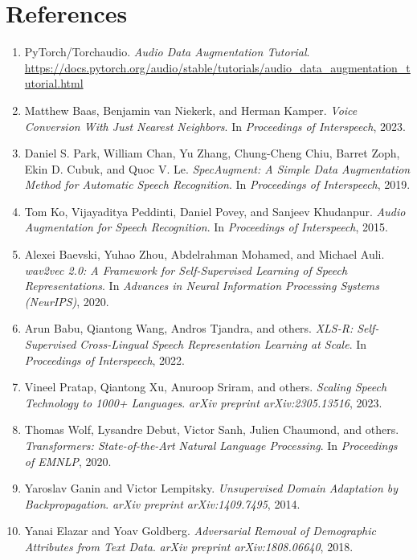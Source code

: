 \documentclass[11pt]{article}
\begin{document}
\section*{References}
\begin{enumerate}

\item PyTorch/Torchaudio. \emph{Audio Data Augmentation Tutorial}.  
\url{https://docs.pytorch.org/audio/stable/tutorials/audio_data_augmentation_tutorial.html}

\item Matthew Baas, Benjamin van Niekerk, and Herman Kamper.  
\emph{Voice Conversion With Just Nearest Neighbors}.  
In \textit{Proceedings of Interspeech}, 2023.

\item Daniel S. Park, William Chan, Yu Zhang, Chung-Cheng Chiu, Barret Zoph, Ekin D. Cubuk, and Quoc V. Le.  
\emph{SpecAugment: A Simple Data Augmentation Method for Automatic Speech Recognition}.  
In \textit{Proceedings of Interspeech}, 2019.

\item Tom Ko, Vijayaditya Peddinti, Daniel Povey, and Sanjeev Khudanpur.  
\emph{Audio Augmentation for Speech Recognition}.  
In \textit{Proceedings of Interspeech}, 2015.

\item Alexei Baevski, Yuhao Zhou, Abdelrahman Mohamed, and Michael Auli.  
\emph{wav2vec 2.0: A Framework for Self-Supervised Learning of Speech Representations}.  
In \textit{Advances in Neural Information Processing Systems (NeurIPS)}, 2020.

\item Arun Babu, Qiantong Wang, Andros Tjandra, and others.  
\emph{XLS-R: Self-Supervised Cross-Lingual Speech Representation Learning at Scale}.  
In \textit{Proceedings of Interspeech}, 2022.

\item Vineel Pratap, Qiantong Xu, Anuroop Sriram, and others.  
\emph{Scaling Speech Technology to 1000+ Languages}.  
\textit{arXiv preprint arXiv:2305.13516}, 2023.

\item Thomas Wolf, Lysandre Debut, Victor Sanh, Julien Chaumond, and others.  
\emph{Transformers: State-of-the-Art Natural Language Processing}.  
In \textit{Proceedings of EMNLP}, 2020.

\item Yaroslav Ganin and Victor Lempitsky.  
\emph{Unsupervised Domain Adaptation by Backpropagation}.  
\textit{arXiv preprint arXiv:1409.7495}, 2014.

\item Yanai Elazar and Yoav Goldberg.  
\emph{Adversarial Removal of Demographic Attributes from Text Data}.  
\textit{arXiv preprint arXiv:1808.06640}, 2018.

\end{enumerate}
\end{document}
